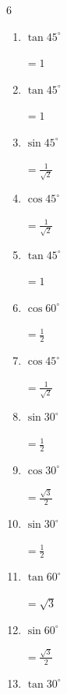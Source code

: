\begin{multicols}{6}
\begin{enumerate}
        $\displaystyle =\frac{1}{\sqrt{2}}$

\columnbreak %

\resetques

  \item $\displaystyle \tan{45^\circ}$

        $\displaystyle =1$

  \item $\displaystyle \tan{45^\circ}$

        $\displaystyle =1$

  \item $\displaystyle \sin{45^\circ}$

        $\displaystyle =\frac{1}{\sqrt{2}}$

  \item $\displaystyle \cos{45^\circ}$

        $\displaystyle =\frac{1}{\sqrt{2}}$

  \item $\displaystyle \tan{45^\circ}$

        $\displaystyle =1$

  \item $\displaystyle \cos{60^\circ}$

        $\displaystyle =\frac{1}{2}$

  \item $\displaystyle \cos{45^\circ}$

        $\displaystyle =\frac{1}{\sqrt{2}}$

  \item $\displaystyle \sin{30^\circ}$

        $\displaystyle =\frac{1}{2}$

  \item $\displaystyle \cos{30^\circ}$

        $\displaystyle =\frac{\sqrt{3}}{2}$

  \item $\displaystyle \sin{30^\circ}$

        $\displaystyle =\frac{1}{2}$

  \item $\displaystyle \tan{60^\circ}$

        $\displaystyle =\sqrt{3}$

  \item $\displaystyle \sin{60^\circ}$

        $\displaystyle =\frac{\sqrt{3}}{2}$

  \item $\displaystyle \tan{30^\circ}$


\end{enumerate}
\end{multicols}
